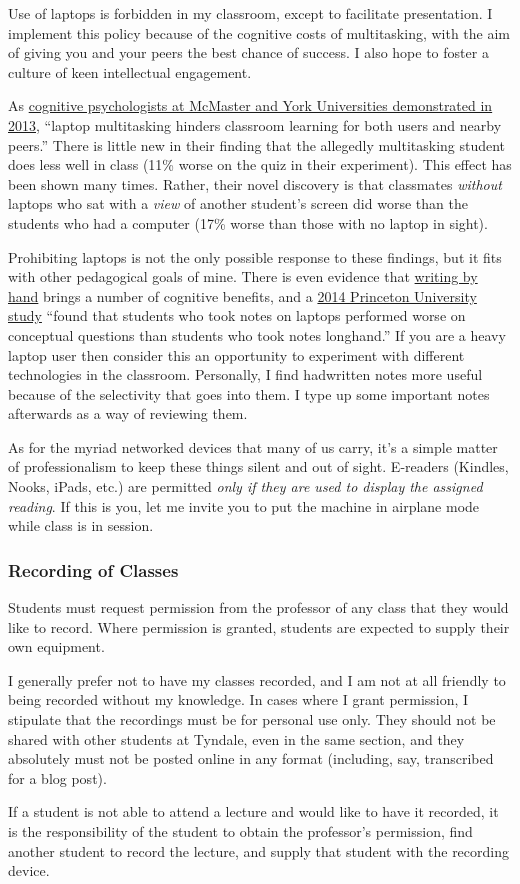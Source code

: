 Use of laptops is forbidden in my classroom, except to facilitate presentation.
I implement this policy because of the cognitive costs of multitasking, with the
aim of giving you and your peers the best chance of success. I also hope to
foster a culture of keen intellectual engagement.

As \href{http://dx.doi.org/10.1016/j.compedu.2012.10.003}{cognitive
psychologists at McMaster and York Universities demonstrated in 2013}, ``laptop
multitasking hinders classroom learning for both users and nearby peers.'' There
is little new in their finding that the allegedly multitasking student does less
well in class (11\% worse on the quiz in their experiment). This effect has been
shown many times. Rather, their novel discovery is that classmates
\emph{without} laptops who sat with a \emph{view} of another student's screen
did worse than the students who had a computer (17\% worse than those with no
laptop in sight).

Prohibiting laptops is not the only possible response to these findings, but it
fits with other pedagogical goals of mine. There is even evidence that
\href{http://on.wsj.com/pjtJaK}{writing by hand} brings a number of cognitive
benefits, and a \href{http://dx.doi.org/10.1177/0956797614524581}{2014 Princeton
University study} ``found that students who took notes on laptops performed
worse on conceptual questions than students who took notes longhand.'' If you
are a heavy laptop user then consider this an opportunity to experiment with
different technologies in the classroom. Personally, I find hadwritten notes
more useful because of the selectivity that goes into them. I type up some
important notes afterwards as a way of reviewing them.

As for the myriad networked devices that many of us carry, it's a simple matter
of professionalism to keep these things silent and out of sight. E-readers
(Kindles, Nooks, iPads, etc.) are permitted \emph{only if they are used to
display the assigned reading}. If this is you, let me invite you to put the
machine in airplane mode while class is in session.

\subsubsection{Recording of Classes}
\label{recording}

Students must request permission from the professor of any class that they
would like to record. Where permission is granted, students are expected to
supply their own equipment.

I generally prefer not to have my classes recorded, and I am not at all
friendly to being recorded without my knowledge. In cases where I grant
permission, I stipulate that the recordings must be for personal use only. They
should not be shared with other students at Tyndale, even in the same section,
and they absolutely must not be posted online in any format (including, say,
transcribed for a blog post).

If a student is not able to attend a lecture and would like to have it
recorded, it is the responsibility of the student to obtain the professor's
permission, find another student to record the lecture, and supply that student
with the recording device.

